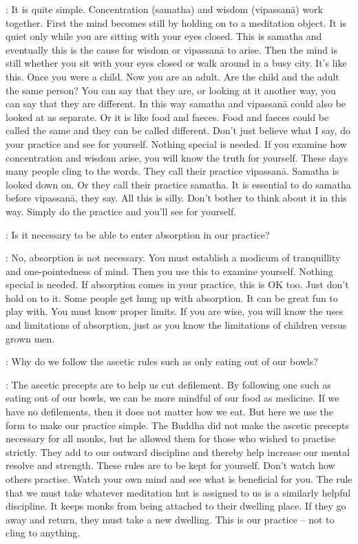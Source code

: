 : It is quite simple. Concentration (samatha) and wisdom (vipassan\=a) work together. First the mind becomes still by holding on to a meditation object. It is quiet only while you are sitting with your eyes closed. This is samatha and eventually this  is the cause for wisdom or vipassan\=a to arise. Then the mind is still whether you sit with your eyes closed or walk around in a busy city. It's like this. Once you were a child. Now you are an adult. Are the child and the adult the same person? You can say that they are, or looking at it another way, you can say that they are different. In this way samatha and vipassan\=a could also be looked at as separate. Or it is like food and faeces. Food and faeces could be called the same and they can be called different. Don't just believe what I say, do your practice and see for yourself. Nothing special is needed. If you examine how concentration and wisdom arise, you will know the truth for yourself. These days many people cling to the words. They call their practice vipassan\=a. Samatha is looked down on. Or they call their practice samatha. It is essential to do samatha before vipassan\=a, they say. All this is silly. Don't bother to think about it in this way. Simply do the practice and you'll see for yourself.

:
Is it necessary to be able to enter absorption in our practice?

: No, absorption is not necessary. You must establish a modicum of tranquillity and one-pointedness of mind. Then you use this to examine yourself. Nothing special is needed. If absorption comes in your practice, this is OK too. Just don't hold on to it. Some people get hung up with absorption. It can be great fun to play with. You must know proper limits. If you are wise, you will know the uses and limitations of absorption, just as you know the limitations of children versus grown men.

:
Why do we follow the ascetic rules such as only eating out of our bowls?

: The ascetic precepts are to help us cut defilement. By following one such as eating out of our bowls, we can be more mindful of our food as medicine. If we have no defilements, then it does not matter how we eat. But here we use the form to make our practice simple. The Buddha did not make the ascetic precepts necessary for all monks, but he allowed them for those who wished to practise strictly. They add to our outward discipline and thereby help increase our mental resolve and strength. These rules are to be kept for yourself. Don't watch how others practise. Watch your own mind and see what is beneficial for you. The rule that we must take whatever meditation hut is assigned to us is a similarly helpful discipline. It keeps monks from being attached to their dwelling place. If they go away and return, they must take a new dwelling. This is our practice -- not to cling to anything.

